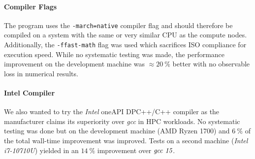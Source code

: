 	\paragraph{Compiler Flags}
		The program uses the \texttt{-march=native} compiler flag and should therefore be compiled on a system with the same or very similar CPU as the compute nodes. Additionally, the \texttt{-ffast-math} flag was used which sacrifices ISO compliance for execution speed. While no systematic testing was made, the performance improvement on the development machine was $\approx \SI{20}{\percent}$ better with no observable loss in numerical results. 
	
	\paragraph{Intel Compiler}
		We also wanted to try the \emph{Intel\textsuperscript{\tiny\textregistered}} oneAPI DPC++/C++ compiler as the manufacturer claims its superiority over \emph{gcc} in HPC workloads. No systematic testing was done but on the development machine (AMD Ryzen 1700) and $\SI{6}{\percent}$ of the total wall-time improvement was improved. Tests on a second machine (\emph{Intel\textsuperscript{\tiny\textregistered} i7-10710U}) yielded in an $\SI{14}{\percent}$ improvement over $\emph{gcc 15}$.
			
	


	